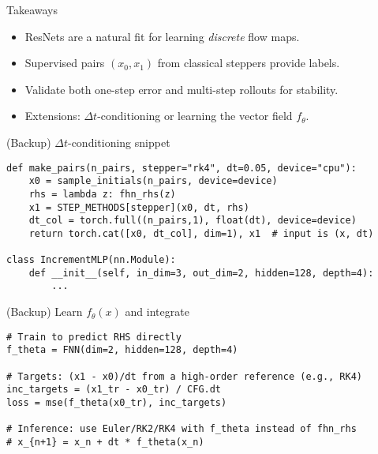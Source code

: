 \documentclass[aspectratio=169]{beamer}
\begin{document}
\begin{frame}{Takeaways}
\begin{itemize}
  \item ResNets are a natural fit for learning \emph{discrete} flow maps.
  \item Supervised pairs $(x_0, x_1)$ from classical steppers provide labels.
  \item Validate both one-step error and multi-step rollouts for stability.
  \item Extensions: $\Delta t$-conditioning or learning the vector field $f_\theta$.
\end{itemize}
\end{frame}

\begin{frame}[fragile]{(Backup) $\Delta t$-conditioning snippet}
\begin{lstlisting}[style=py]
def make_pairs(n_pairs, stepper="rk4", dt=0.05, device="cpu"):
    x0 = sample_initials(n_pairs, device=device)
    rhs = lambda z: fhn_rhs(z)
    x1 = STEP_METHODS[stepper](x0, dt, rhs)
    dt_col = torch.full((n_pairs,1), float(dt), device=device)
    return torch.cat([x0, dt_col], dim=1), x1  # input is (x, dt)

class IncrementMLP(nn.Module):
    def __init__(self, in_dim=3, out_dim=2, hidden=128, depth=4):
        ...
\end{lstlisting}
\end{frame}

\begin{frame}[fragile]{(Backup) Learn $f_\theta(x)$ and integrate}
\begin{lstlisting}[style=py]
# Train to predict RHS directly
f_theta = FNN(dim=2, hidden=128, depth=4)

# Targets: (x1 - x0)/dt from a high-order reference (e.g., RK4)
inc_targets = (x1_tr - x0_tr) / CFG.dt
loss = mse(f_theta(x0_tr), inc_targets)

# Inference: use Euler/RK2/RK4 with f_theta instead of fhn_rhs
# x_{n+1} = x_n + dt * f_theta(x_n)
\end{lstlisting}
\end{frame}
\end{document}

